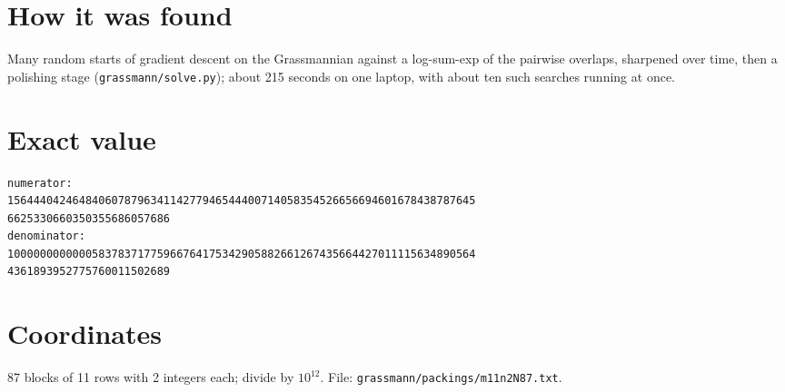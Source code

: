 \documentclass[11pt,a4paper]{article}
\begin{document}
\section{How it was found}
Many random starts of gradient descent on the Grassmannian against a log-sum-exp of the pairwise overlaps, sharpened over time, then a polishing stage (\texttt{grassmann/solve.py}); about 215 seconds on one laptop, with about ten such searches running at once.


\appendix
\section{Exact value}
{\small
\begin{verbatim}
numerator:
156444042464840607879634114277946544400714058354526656694601678438787645
6625330660350355686057686
denominator:
100000000000058378371775966764175342905882661267435664427011115634890564
4361893952775760011502689
\end{verbatim}}

\section{Coordinates}
87 blocks of 11 rows with 2 integers each; divide by $10^{12}$. File: \texttt{grassmann/packings/m11n2N87.txt}.
{\tiny
\begin{multicols}{4}
\end{multicols}}
\end{document}
